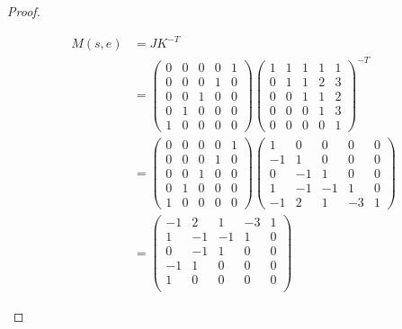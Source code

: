 \documentclass[12pt]{extarticle}
\newcommand{\<}{\langle}
\renewcommand{\>}{\rangle}
\theoremstyle{definition}
\begin{document}
\begin{proof}
\begin{enumerate}
    \begin{align*}
      M(s,e) &= 
      JK^{-T} \\
      &=
      \begin{pmatrix}
        0 & 0 & 0 & 0 & 1 \\
        0 & 0 & 0 & 1 & 0 \\
        0 & 0 & 1 & 0 & 0 \\
        0 & 1 & 0 & 0 & 0 \\
        1 & 0 & 0 & 0 & 0
      \end{pmatrix}
      \begin{pmatrix}
        1 & 1 & 1 & 1 & 1 \\
        0 & 1 & 1 & 2 & 3 \\
        0 & 0 & 1 & 1 & 2 \\
        0 & 0 & 0 & 1 & 3 \\
        0 & 0 & 0 & 0 & 1 
      \end{pmatrix}^{-T} \\
      &=
      \begin{pmatrix}
        0 & 0 & 0 & 0 & 1 \\
        0 & 0 & 0 & 1 & 0 \\
        0 & 0 & 1 & 0 & 0 \\
        0 & 1 & 0 & 0 & 0 \\
        1 & 0 & 0 & 0 & 0
      \end{pmatrix}
      \begin{pmatrix}
        1 & 0 & 0 & 0 & 0 \\
        -1 & 1 & 0 & 0 & 0 \\
        0 & -1 & 1 & 0 & 0 \\
        1 & -1 & -1 & 1 & 0 \\
        -1 & 2 & 1 & -3 & 1 
      \end{pmatrix} \\
      &=
      \begin{pmatrix}
        -1 &  2 &  1 & -3  & 1 \\
         1 & -1 & -1 &  1  & 0 \\
         0 & -1 &  1 &  0  & 0 \\
        -1 &  1 &  0 &  0  & 0 \\
         1 &  0 &  0 &  0  & 0 \\
      \end{pmatrix}
    \end{align*}


\end{enumerate}
\end{proof}
\end{document}

